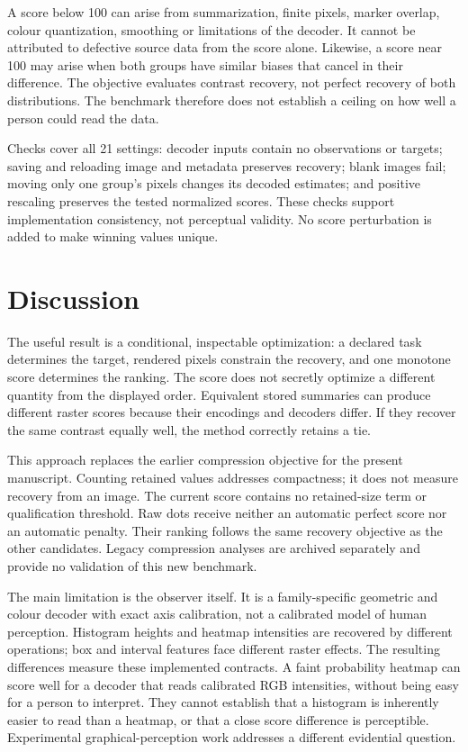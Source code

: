 \documentclass[11pt]{article}
\begin{document}
A score below 100 can arise from summarization, finite pixels, marker overlap, colour quantization, smoothing or limitations of the decoder. It cannot be attributed to defective source data from the score alone. Likewise, a score near 100 may arise when both groups have similar biases that cancel in their difference. The objective evaluates contrast recovery, not perfect recovery of both distributions. The benchmark therefore does not establish a ceiling on how well a person could read the data.

Checks cover all 21 settings: decoder inputs contain no observations or targets; saving and reloading image and metadata preserves recovery; blank images fail; moving only one group's pixels changes its decoded estimates; and positive rescaling preserves the tested normalized scores. These checks support implementation consistency, not perceptual validity. No score perturbation is added to make winning values unique.

\section*{Discussion}
The useful result is a conditional, inspectable optimization: a declared task determines the target, rendered pixels constrain the recovery, and one monotone score determines the ranking. The score does not secretly optimize a different quantity from the displayed order. Equivalent stored summaries can produce different raster scores because their encodings and decoders differ. If they recover the same contrast equally well, the method correctly retains a tie.

This approach replaces the earlier compression objective for the present manuscript. Counting retained values addresses compactness; it does not measure recovery from an image. The current score contains no retained-size term or qualification threshold. Raw dots receive neither an automatic perfect score nor an automatic penalty. Their ranking follows the same recovery objective as the other candidates. Legacy compression analyses are archived separately and provide no validation of this new benchmark.

The main limitation is the observer itself. It is a family-specific geometric and colour decoder with exact axis calibration, not a calibrated model of human perception. Histogram heights and heatmap intensities are recovered by different operations; box and interval features face different raster effects. The resulting differences measure these implemented contracts. A faint probability heatmap can score well for a decoder that reads calibrated RGB intensities, without being easy for a person to interpret. They cannot establish that a histogram is inherently easier to read than a heatmap, or that a close score difference is perceptible. Experimental graphical-perception work addresses a different evidential question.\cite{cleveland1984}
\end{document}
